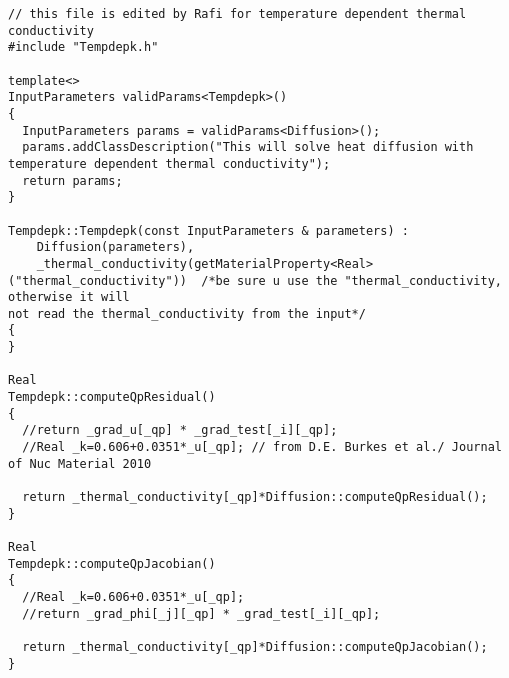 \begin{lstlisting}
// this file is edited by Rafi for temperature dependent thermal conductivity
#include "Tempdepk.h"

template<>
InputParameters validParams<Tempdepk>()
{
  InputParameters params = validParams<Diffusion>();
  params.addClassDescription("This will solve heat diffusion with temperature dependent thermal conductivity");
  return params;
}

Tempdepk::Tempdepk(const InputParameters & parameters) :
    Diffusion(parameters),
	_thermal_conductivity(getMaterialProperty<Real>("thermal_conductivity"))  /*be sure u use the "thermal_conductivity, otherwise it will
not read the thermal_conductivity from the input*/
{
}

Real
Tempdepk::computeQpResidual()
{
  //return _grad_u[_qp] * _grad_test[_i][_qp];
  //Real _k=0.606+0.0351*_u[_qp]; // from D.E. Burkes et al./ Journal of Nuc Material 2010

  return _thermal_conductivity[_qp]*Diffusion::computeQpResidual();
}

Real
Tempdepk::computeQpJacobian()
{
  //Real _k=0.606+0.0351*_u[_qp];
  //return _grad_phi[_j][_qp] * _grad_test[_i][_qp];

  return _thermal_conductivity[_qp]*Diffusion::computeQpJacobian();
}

\end{lstlisting}
\pagebreak

